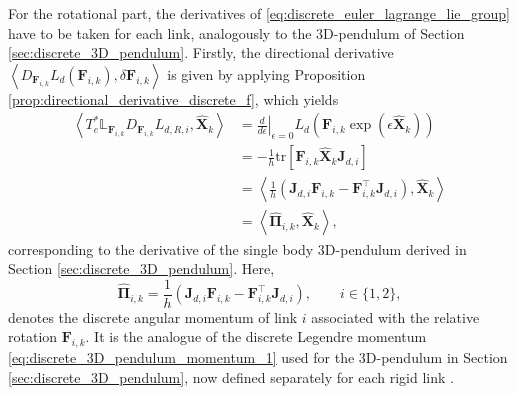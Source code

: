 For the rotational part, the derivatives of \eqref{eq:discrete_euler_lagrange_lie_group} have to be taken for each link, analogously to the 3D-pendulum of Section \ref{sec:discrete_3D_pendulum}.
Firstly, the directional derivative $\left\langle D_{\bm{F}_{i,k}}L_d(\bm{F}_{i,k}), \delta \bm{F}_{i,k} \right\rangle$ is given by applying Proposition \eqref{prop:directional_derivative_discrete_f}, which yields
\begin{equation}
    \begin{aligned}
    \left\langle
    T_e^*\mathbb{L}_{\bm{F}_{i,k}}
    D_{\bm{F}_{i,k}}L_{d,R,i},
    \widehat{\bm{X}}_k
    \right\rangle
    &=
    \left.
    \frac{d}{d\epsilon}
    \right|_{\epsilon=0}
    L_{d}
    \left(
    \bm{F}_{i,k}
    \exp(\epsilon\widehat{\bm{X}}_k)
    \right)
    \\
    &=
    -
    \frac{1}{h}
    \mathrm{tr}
    \left[
    \bm{F}_{i,k}
    \widehat{\bm{X}}_k
    \bm{J}_{d,i}
    \right]
    \\
    &=
    \left\langle
    \frac{1}{h}
    \left(
    \bm{J}_{d,i}\bm{F}_{i,k}
    -
    \bm{F}_{i,k}^{\top}\bm{J}_{d,i}
    \right),
    \widehat{\bm{X}}_k
    \right\rangle
    \\
    &=
    \left\langle
    \bm{\widehat{\Pi}}_{i,k}
    ,
    \widehat{\bm{X}}_k
    \right\rangle
    , 
    \end{aligned}
    \label{eq:acrobot_rotational_derivative_pairing}
\end{equation}
corresponding to the derivative of the single body 3D-pendulum derived in Section \ref{sec:discrete_3D_pendulum}. 
Here,
\begin{equation}
    \bm{\widehat{\Pi}}_{i,k}
    =
    \frac{1}{h}
    \left(
        \bm{J}_{d,i}\bm{F}_{i,k}
        -
        \bm{F}_{i,k}^{\top}\bm{J}_{d,i}
    \right),
    \qquad i\in\{1,2\},
    \label{eq:acrobot_discrete_angular_momentum}
\end{equation}
denotes the discrete angular momentum
of link \(i\) associated with the relative rotation \(\bm{F}_{i,k}\).
It is the analogue of the discrete Legendre momentum \eqref{eq:discrete_3D_pendulum_momentum_1} used for
the 3D-pendulum in Section \ref{sec:discrete_3D_pendulum}, now defined separately for each rigid link \cite{Lee2008}.

